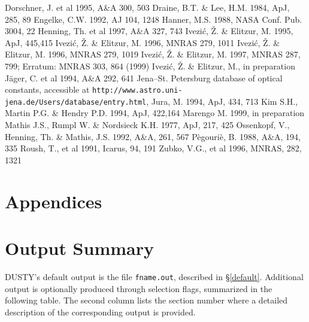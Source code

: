 \documentclass[12pt]{article} \usepackage{epsf}
\def\Section#1{\section{\sc #1}}
\def\D  {{\sf DUSTY}}
\def\Ivezic {Ivezi\'c}
\def\tthdump#1{#1}      %
\begin{document}
\begin{thebibliography}{99}
  Dorschner, J. et al 1995, A\&A 300, 503
    Draine, B.T. \& Lee, H.M. 1984, ApJ, 285, 89
  Engelke, C.W. 1992, AJ 104, 1248
  Hanner, M.S. 1988, NASA Conf. Pub. 3004, 22
  Henning, Th. et al 1997, A\&A 327, 743
    \Ivezic, \v Z. \& Elitzur, M. 1995, ApJ, 445,415
   \Ivezic, \v Z. \& Elitzur, M. 1996, MNRAS 279, 1011
   \Ivezic, \v Z. \& Elitzur, M. 1996, MNRAS 279, 1019
    \tthdump{\Ivezic, \v Z. \& Elitzur, M. 1997, MNRAS 287, 799; \newline}
      Erratum: MNRAS 303, 864 (1999)
  \Ivezic, \v Z. \& Elitzur, M., in preparation
  J\"ager, C. et al 1994, A\&A 292, 641
    Jena--St. Petersburg database of optical constants,
                  accessible at \newline
                  {\tt http://www.astro.uni-jena.de/Users/database/entry.html},
    Jura, M. 1994, ApJ, 434, 713
   Kim S.H., Martin P.G. \& Hendry P.D. 1994, ApJ, 422,164
  Marengo M. 1999, in preparation
   Mathis J.S., Rumpl W. \& Nordsieck K.H. 1977, ApJ, 217, 425
   Ossenkopf, V., Henning, Th. \& Mathis, J.S. 1992, A\&A, 261,
                  567
   P\`egouri\`e, B. 1988, A\&A, 194, 335
   Roush, T., et al 1991, Icarus, 94, 191
   Zubko, V.G., et al 1996, MNRAS, 282, 1321

\end{thebibliography}

\newpage
\appendix
\section*{\sc Appendices}

\Section{Output Summary} \label{summary}

\D's default output is the file {\tt fname.out}, described in \S\ref{default}.
Additional output is optionally produced through selection flags, summarized in
the following table.  The second column lists the section number where a
detailed description of the corresponding output is provided.
\end{document}
